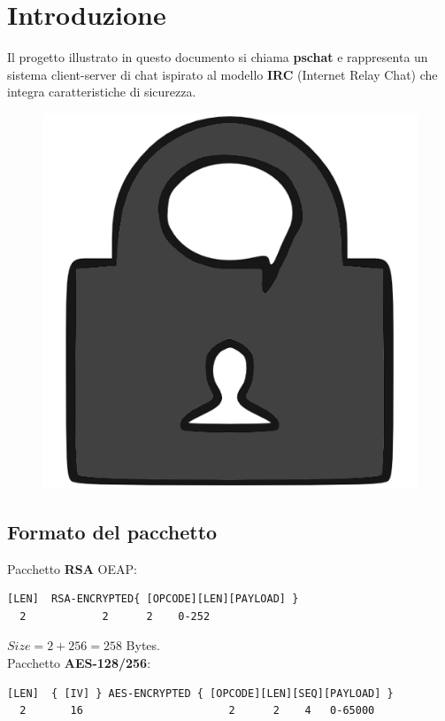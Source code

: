 \documentclass[a4paper,titlepage]{article}
\begin{document}
\section{Introduzione}  \thispagestyle{plain}
Il progetto illustrato in questo documento si chiama \textbf{pschat} e rappresenta un sistema client-server di chat ispirato al modello \textbf{IRC} (Internet Relay Chat) che integra caratteristiche di sicurezza.\\
\begin{figure}[H]
  \centering \includegraphics[scale=1.0]{../data/psc_orig.png}
\end{figure}

\subsection{Formato del pacchetto}

Pacchetto \textbf{RSA} OEAP:
\begin{verbatim}
[LEN]  RSA-ENCRYPTED{ [OPCODE][LEN][PAYLOAD] }
  2            2      2    0-252
\end{verbatim}
$Size = 2 + 256= 258$ Bytes.\\

Pacchetto \textbf{AES-128/256}:
\begin{verbatim}
[LEN]  { [IV] } AES-ENCRYPTED { [OPCODE][LEN][SEQ][PAYLOAD] }
  2       16                       2      2    4   0-65000
\end{verbatim}
\end{document}
